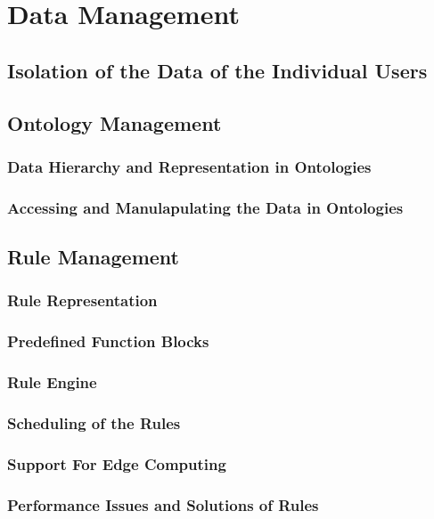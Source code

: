 \chapter{Data Management}\label{chapter:data_management}

\section{Isolation of the Data of the Individual Users}


\section{Ontology Management}

\subsection{Data Hierarchy and Representation in Ontologies}

\subsection{Accessing and Manulapulating the Data in Ontologies}


\section{Rule Management}

\subsection{Rule Representation}

\subsection{Predefined Function Blocks}

\subsection{Rule Engine}

\subsection{Scheduling of the Rules}

\subsection{Support For Edge Computing}

\subsection{Performance Issues and Solutions of Rules}

